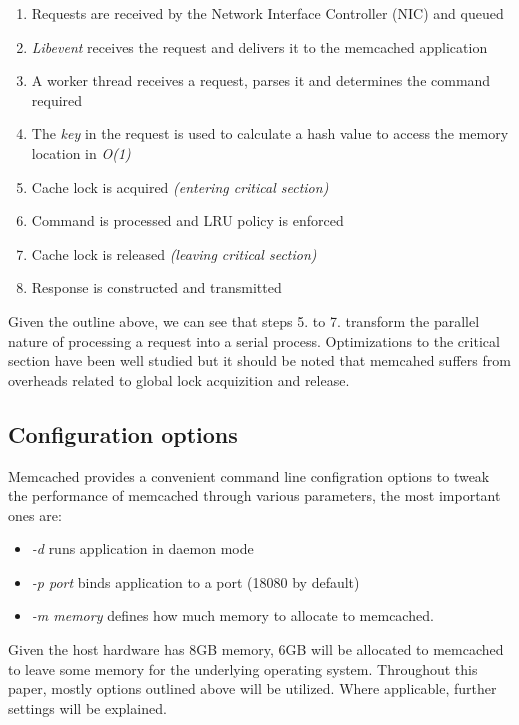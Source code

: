 \begin{enumerate}
    \item Requests are received by the Network Interface Controller (NIC) and queued
    \item \emph{Libevent} receives the request and delivers it to the memcached application
    \item A worker thread receives a request, parses it and determines the command required
    \item The \emph{key} in the request is used to calculate a hash value to access the memory location in \emph{O(1)}
    \item Cache lock is acquired \emph{(entering critical section)}
    \item Command is processed and LRU policy is enforced
    \item Cache lock is released \emph{(leaving critical section)}
    \item Response is constructed and transmitted
\end{enumerate}

Given the outline above, we can see that steps 5. to 7. transform the parallel nature of processing a request into a serial process. Optimizations to the critical section have been well studied but it should be noted that memcahed suffers from overheads related to global lock acquizition and release.


\subsection{Configuration options}
Memcached provides a convenient command line configration options to tweak the performance of memcached through various parameters, the most important ones are:
\begin{itemize}
    \item \emph{-d} runs application in daemon mode
    \item \emph{-p port} binds application to a port (18080 by default)
    \item \emph{-m memory} defines how much memory to allocate to memcached.
\end{itemize}

Given the host hardware has 8GB memory, 6GB will be allocated to memcached to leave some memory for the underlying operating system. Throughout this paper, mostly options outlined above will be utilized. Where applicable, further settings will be explained.


